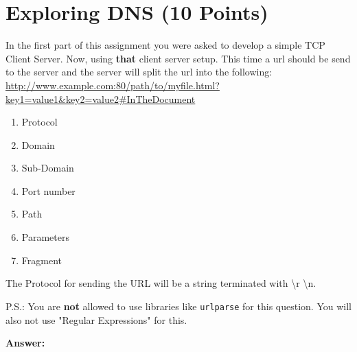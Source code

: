 \documentclass{WeSTassignment}
\begin{document}

\section{Exploring DNS (10 Points)}

In the first part of this assignment you were asked to develop a simple TCP Client Server. Now, using \textbf{that} client server setup.
This time a url should be send to the server and the server will split the url into the following:\\ 

\url{http://www.example.com:80/path/to/myfile.html?key1=value1&key2=value2#InTheDocument}

\begin{enumerate}
\item Protocol
\item Domain
\item Sub-Domain
\item Port number
\item Path
\item Parameters
\item Fragment
\end{enumerate}

The Protocol for sending the URL will be a string terminated with \backslash r \backslash n.

P.S.: You are \textbf{not} allowed to use libraries like \texttt{urlparse} for this question. You will also not use "Regular Expressions" for this. 

\textbf{Answer:} 
\end{document}
